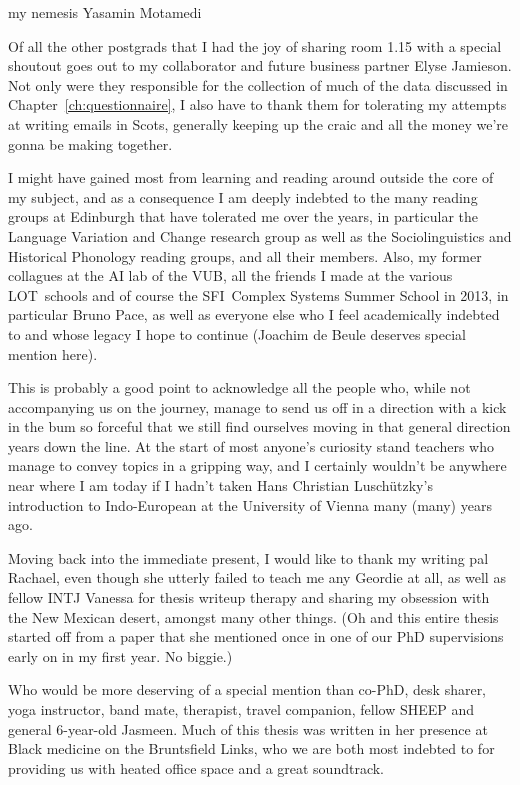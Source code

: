 \documentclass[oneside]{book}
\begin{document}
my nemesis Yasamin Motamedi

Of all the other postgrads that I had the joy of sharing room 1.15 with a special shoutout goes out to my collaborator and future business partner Elyse Jamieson. Not only were they responsible for the collection of much of the data discussed in Chapter~\ref{ch:questionnaire}, I also have to thank them for tolerating my attempts at writing emails in Scots, generally keeping up the craic and all the money we're gonna be making together.

I might have gained most from learning and reading around outside the core of my subject, and as a consequence I am deeply indebted to the many reading groups at Edinburgh that have tolerated me over the years, in particular the Language Variation and Change research group as well as the Sociolinguistics and Historical Phonology reading groups, and all their members. Also, my former collagues at the AI lab of the VUB, all the friends I made at the various LOT~schools and of course the SFI~Complex Systems Summer School in 2013, in particular Bruno Pace, as well as everyone else who I feel academically indebted to and whose legacy I hope to continue (Joachim de Beule deserves special mention here).

This is probably a good point to acknowledge all the people who, while not accompanying us on the journey, manage to send us off in a direction with a kick in the bum so forceful that we still find ourselves moving in that general direction years down the line. At the start of most anyone's curiosity stand teachers who manage to convey topics in a gripping way, and I certainly wouldn't be anywhere near where I am today if I hadn't taken Hans Christian Luschützky's introduction to Indo-European at the University of Vienna many (many) years ago. %

Moving back into the immediate present, I would like to thank my writing pal Rachael, even though she utterly failed to teach me any Geordie at all, as well as fellow INTJ Vanessa for thesis writeup therapy and sharing my obsession with the New Mexican desert, amongst many other things. (Oh and this entire thesis started off from a paper that she mentioned once in one of our PhD supervisions early on in my first year. No biggie.)

Who would be more deserving of a special mention than co-PhD, desk sharer, yoga instructor, band mate, therapist, travel companion, fellow SHEEP and general 6-year-old Jasmeen. Much of this thesis was written in her presence at Black medicine on the Bruntsfield Links, who we are both most indebted to for providing us with heated office space and a great soundtrack.
\end{document}

